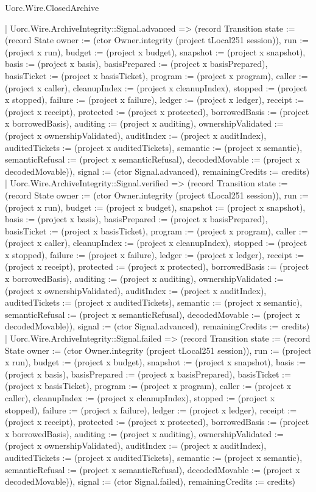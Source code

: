 \begin{lexlean}{Uorc.Wire.ClosedArchive}
\begin{semanticmodule}
{      | Uorc.Wire.ArchiveIntegrity::Signal.advanced => (record Transition {state := (record State {owner := (ctor Owner.integrity (project tLocal251 session)), run := (project x run), budget := (project x budget), snapshot := (project x snapshot), basis := (project x basis), basisPrepared := (project x basisPrepared), basisTicket := (project x basisTicket), program := (project x program), caller := (project x caller), cleanupIndex := (project x cleanupIndex), stopped := (project x stopped), failure := (project x failure), ledger := (project x ledger), receipt := (project x receipt), protected := (project x protected), borrowedBasis := (project x borrowedBasis), auditing := (project x auditing), ownershipValidated := (project x ownershipValidated), auditIndex := (project x auditIndex), auditedTickets := (project x auditedTickets), semantic := (project x semantic), semanticRefusal := (project x semanticRefusal), decodedMovable := (project x decodedMovable)}), signal := (ctor Signal.advanced), remainingCredits := credits})
      | Uorc.Wire.ArchiveIntegrity::Signal.verified => (record Transition {state := (record State {owner := (ctor Owner.integrity (project tLocal251 session)), run := (project x run), budget := (project x budget), snapshot := (project x snapshot), basis := (project x basis), basisPrepared := (project x basisPrepared), basisTicket := (project x basisTicket), program := (project x program), caller := (project x caller), cleanupIndex := (project x cleanupIndex), stopped := (project x stopped), failure := (project x failure), ledger := (project x ledger), receipt := (project x receipt), protected := (project x protected), borrowedBasis := (project x borrowedBasis), auditing := (project x auditing), ownershipValidated := (project x ownershipValidated), auditIndex := (project x auditIndex), auditedTickets := (project x auditedTickets), semantic := (project x semantic), semanticRefusal := (project x semanticRefusal), decodedMovable := (project x decodedMovable)}), signal := (ctor Signal.advanced), remainingCredits := credits})
      | Uorc.Wire.ArchiveIntegrity::Signal.failed => (record Transition {state := (record State {owner := (ctor Owner.integrity (project tLocal251 session)), run := (project x run), budget := (project x budget), snapshot := (project x snapshot), basis := (project x basis), basisPrepared := (project x basisPrepared), basisTicket := (project x basisTicket), program := (project x program), caller := (project x caller), cleanupIndex := (project x cleanupIndex), stopped := (project x stopped), failure := (project x failure), ledger := (project x ledger), receipt := (project x receipt), protected := (project x protected), borrowedBasis := (project x borrowedBasis), auditing := (project x auditing), ownershipValidated := (project x ownershipValidated), auditIndex := (project x auditIndex), auditedTickets := (project x auditedTickets), semantic := (project x semantic), semanticRefusal := (project x semanticRefusal), decodedMovable := (project x decodedMovable)}), signal := (ctor Signal.failed), remainingCredits := credits})
}
\end{semanticmodule}
\end{lexlean}
